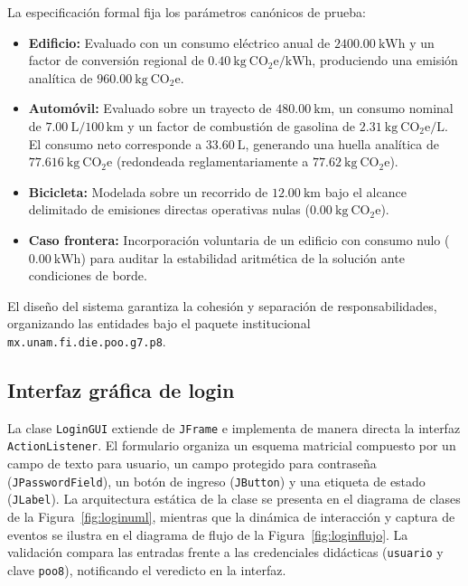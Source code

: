 \documentclass[letterpaper,12pt,oneside]{article}
\numberwithin{figure}{section}
\begin{document}
La especificaci\'on formal fija los par\'ametros can\'onicos de prueba:
\begin{itemize}
  \item \textbf{Edificio:} Evaluado con un consumo el\'ectrico anual de $2400.00\ \mathrm{kWh}$ y un factor de conversi\'on regional de $0.40\ \mathrm{kg\ CO_2e/kWh}$, produciendo una emisi\'on anal\'itica de $960.00\ \mathrm{kg\ CO_2e}$.
  \item \textbf{Autom\'ovil:} Evaluado sobre un trayecto de $480.00\ \mathrm{km}$, un consumo nominal de $7.00\ \mathrm{L/100\,km}$ y un factor de combusti\'on de gasolina de $2.31\ \mathrm{kg\ CO_2e/L}$. El consumo neto corresponde a $33.60\ \mathrm{L}$, generando una huella anal\'itica de $77.616\ \mathrm{kg\ CO_2e}$ (redondeada reglamentariamente a $77.62\ \mathrm{kg\ CO_2e}$).
  \item \textbf{Bicicleta:} Modelada sobre un recorrido de $12.00\ \mathrm{km}$ bajo el alcance delimitado de emisiones directas operativas nulas ($0.00\ \mathrm{kg\ CO_2e}$).
  \item \textbf{Caso frontera:} Incorporaci\'on voluntaria de un edificio con consumo nulo ($0.00\ \mathrm{kWh}$) para auditar la estabilidad aritm\'etica de la soluci\'on ante condiciones de borde.
\end{itemize}

El dise\~no del sistema garantiza la cohesi\'on y separaci\'on de responsabilidades, organizando las entidades bajo el paquete institucional \texttt{mx.unam.fi.die.poo.g7.p8}.

\clearpage
\subsection{Interfaz gr\'afica de login}
La clase \texttt{LoginGUI} extiende de \texttt{JFrame} e implementa de manera directa la interfaz \texttt{ActionListener}. El formulario organiza un esquema matricial compuesto por un campo de texto para usuario, un campo protegido para contrase\~na (\texttt{JPasswordField}), un bot\'on de ingreso (\texttt{JButton}) y una etiqueta de estado (\texttt{JLabel}). La arquitectura est\'atica de la clase se presenta en el diagrama de clases de la Figura~\ref{fig:loginuml}, mientras que la din\'amica de interacci\'on y captura de eventos se ilustra en el diagrama de flujo de la Figura~\ref{fig:loginflujo}. La validaci\'on compara las entradas frente a las credenciales did\'acticas (\texttt{usuario} y clave \texttt{poo8}), notificando el veredicto en la interfaz.
\end{document}
